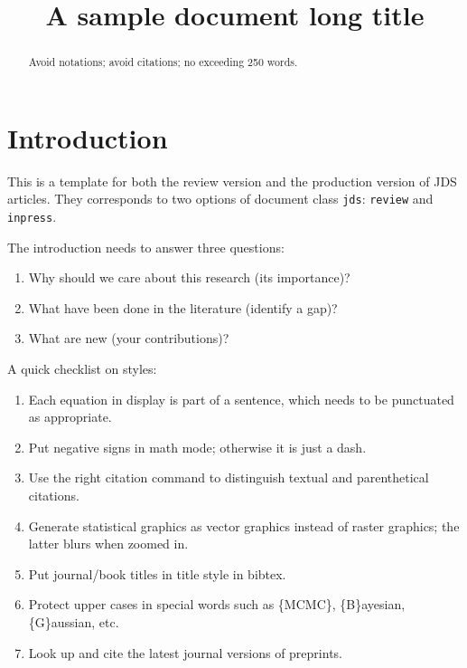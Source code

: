 \documentclass[linenumber]{jdsart}
\theoremstyle{plain}
\theoremstyle{remark}
\theoremstyle{definition}
\begin{document}
\begin{frontmatter}

\title{A sample document long title}

\author[1]{ }
\author[2]{ }
\address[1]{Address of the First author, , }
\address[2]{Address of the Second author, , }

\begin{abstract} %
Avoid notations; avoid citations; no exceeding 250 words. 
\end{abstract}

\begin{keywords} %
\kwd{\LaTeX}
\end{keywords}

\end{frontmatter}

\section{Introduction}

This is a template for both the review version and the
production
version of JDS articles. They corresponds to two options of
document
class \texttt{jds}: \texttt{review} and \texttt{inpress}.


The introduction needs to answer three questions:
\begin{enumerate}
\item Why should we care about this research (its importance)?
\item What have been done in the literature (identify a gap)?
\item What are new (your contributions)?
\end{enumerate}

A quick checklist on styles:
\begin{enumerate}
\item Each equation in display is part of a sentence, which needs to
  be punctuated as appropriate.
\item Put negative signs in math mode; otherwise it is just a dash.
\item Use the right citation command to distinguish textual and
  parenthetical citations.
\item Generate statistical graphics as vector graphics instead of
  raster graphics; the latter blurs when zoomed in.
\item Put journal/book titles in title style in bibtex.
\item Protect upper cases in special words such as \{MCMC\},
  \{B\}ayesian, \{G\}aussian, etc.
\item Look up and cite the latest journal versions of preprints.
\end{enumerate}
\end{document}
